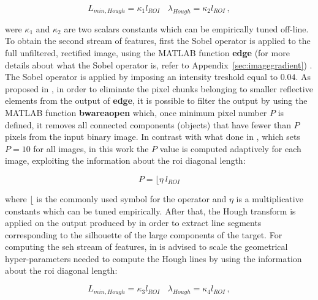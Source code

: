 \begin{equation*}
  L_{min,Hough} = \kappa_1 l_{ROI} \ \ \ \  \lambda_{Hough} = \kappa_2 l_{ROI}  \,,
\end{equation*}

were $\kappa_1$ and $\kappa_2$ are two scalars constants which can be empirically tuned off-line.\\

To obtain the second stream of features, first the Sobel operator is applied to the full unfiltered, rectified image, using the MATLAB function \textbf{edge} (for more details about what the Sobel operator is, refer to Appendix~\ref{sec:imagegradient}) . The Sobel operator is applied by imposing an intensity treshold equal to $0.04$. As proposed in \cite{fracchio2019}, in order to eliminate the pixel chunks belonging to smaller reflective elements from the output of \textbf{edge}, it is possible to filter the output by using the MATLAB function \textbf{bwareaopen} which, once minimum pixel number $P$ is defined, it removes all connected components (objects) that have fewer than $P$ pixels from the input binary image. In contrast with what done in \cite{fracchio2019}, which sets $P = 10$ for all images, in this work the $P$ value is computed adaptively for each image, exploiting the information about the \acrshort{roi} diagonal length:

\begin{equation*}
  P = \lfloor \eta \ l_{ROI}
\end{equation*}

where $\lfloor$ is the commonly used symbol for the  operator and $\eta$ is a multiplicative constants which can be tuned empirically. After that, the Hough transform is applied on the output produced by  in order to extract line segments corresponding to the silhouette of the large components of the target. For computing the \acrfull{seh} stream of features, in \cite{Sharma2018} is advised to scale the geometrical hyper-parameters needed to compute the Hough lines by using the information about the \acrshort{roi} diagonal length:

\begin{equation*}
  L_{min,Hough} = \kappa_3 l_{ROI} \ \ \ \  \lambda_{Hough} = \kappa_4 l_{ROI}  \,,
\end{equation*}

